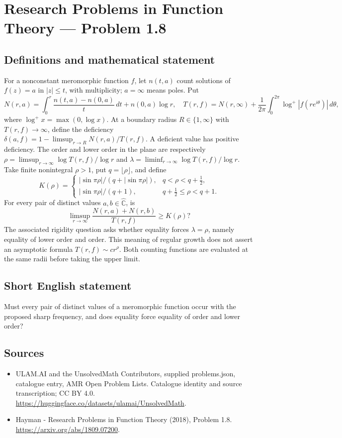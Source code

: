 \documentclass[11pt,a4paper]{article}
\begin{document}
\section*{Research Problems in Function Theory — Problem 1.8}\label{statement}

\subsection{Definitions and mathematical statement}
For a nonconstant meromorphic function $f$, let $n(t,a)$ count solutions of $f(z)=a$ in $|z|\le t$, with multiplicity; $a=\infty$ means poles. Put
\[
N(r,a)=\int_0^r\frac{n(t,a)-n(0,a)}t\,dt+n(0,a)\log r,
\quad T(r,f)=N(r,\infty)+\frac1{2\pi}\int_0^{2\pi}\log^+|f(re^{i\theta})|\,d\theta,
\]
where $\log^+x=\max(0,\log x)$. At a boundary radius $R\in\{1,\infty\}$ with $T(r,f)\to\infty$, define the deficiency
$\delta(a,f)=1-\limsup_{r\to R}N(r,a)/T(r,f)$. A deficient value has positive deficiency. The order and lower order in the plane are respectively
$\rho=\limsup_{r\to\infty}\log T(r,f)/\log r$ and
$\lambda=\liminf_{r\to\infty}\log T(r,f)/\log r$.
Take finite nonintegral $\rho>1$, put $q=\lfloor\rho\rfloor$, and define
\[
K(\rho)=\begin{cases}
|\sin\pi\rho|/(q+|\sin\pi\rho|),&q<\rho<q+\tfrac12,\\
|\sin\pi\rho|/(q+1),&q+\tfrac12\le\rho<q+1.
\end{cases}
\]
For every pair of distinct values $a,b\in\widehat{\mathbb C}$, is
\[
\limsup_{r\to\infty}\frac{N(r,a)+N(r,b)}{T(r,f)}\ge K(\rho)?
\]
The associated rigidity question asks whether equality forces $\lambda=\rho$, namely equality of lower order and order. This meaning of regular growth does not assert an asymptotic formula $T(r,f)\sim cr^\rho$. Both counting functions are evaluated at the same radii before taking the upper limit.
\subsection{Short English statement}
Must every pair of distinct values of a meromorphic function occur with the proposed sharp frequency, and does equality force equality of order and lower order?
\subsection{Sources}
\begin{itemize}
\item[S1] ULAM.AI and the UnsolvedMath Contributors, supplied problems.json, catalogue entry, AMR Open Problem Lists. Catalogue identity and source transcription; CC BY 4.0.
\url{https://huggingface.co/datasets/ulamai/UnsolvedMath}.
\item[S2] Hayman - Research Problems in Function Theory (2018), Problem 1.8. 
\url{https://arxiv.org/abs/1809.07200}.
\end{itemize}
\end{document}
